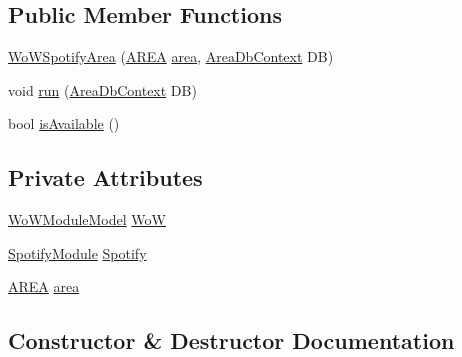 \subsection*{Public Member Functions}
\begin{DoxyCompactItemize}
\item 
\mbox{\hyperlink{classArea_1_1Models_1_1WoWSpotifyArea_a4feb4a5bc81c2721a926bc377617cd9f}{Wo\+W\+Spotify\+Area}} (\mbox{\hyperlink{classArea_1_1Models_1_1AREA}{A\+R\+EA}} \mbox{\hyperlink{classArea_1_1Models_1_1WoWSpotifyArea_ad9c6b94b925f7ad24f6aca9a013b22d9}{area}}, \mbox{\hyperlink{classArea_1_1DAT_1_1AreaDbContext}{Area\+Db\+Context}} DB)
\item 
void \mbox{\hyperlink{classArea_1_1Models_1_1WoWSpotifyArea_a2920b3707f791839a3ec17d9ab45f3df}{run}} (\mbox{\hyperlink{classArea_1_1DAT_1_1AreaDbContext}{Area\+Db\+Context}} DB)
\item 
bool \mbox{\hyperlink{classArea_1_1Models_1_1WoWSpotifyArea_a577046acb0b4537ab57367893dfee2c0}{is\+Available}} ()
\end{DoxyCompactItemize}
\subsection*{Private Attributes}
\begin{DoxyCompactItemize}
\item 
\mbox{\hyperlink{classArea_1_1Models_1_1WoWModuleModel}{Wo\+W\+Module\+Model}} \mbox{\hyperlink{classArea_1_1Models_1_1WoWSpotifyArea_a4be40242af61fddbed8b55ed66176059}{WoW}}
\item 
\mbox{\hyperlink{classArea_1_1Models_1_1SpotifyModule}{Spotify\+Module}} \mbox{\hyperlink{classArea_1_1Models_1_1WoWSpotifyArea_ab3cb9e7674c672fb91ecf16427b4b761}{Spotify}}
\item 
\mbox{\hyperlink{classArea_1_1Models_1_1AREA}{A\+R\+EA}} \mbox{\hyperlink{classArea_1_1Models_1_1WoWSpotifyArea_ad9c6b94b925f7ad24f6aca9a013b22d9}{area}}
\end{DoxyCompactItemize}


\subsection{Constructor \& Destructor Documentation}
\mbox{\label{classArea_1_1Models_1_1WoWSpotifyArea_a4feb4a5bc81c2721a926bc377617cd9f}} 
